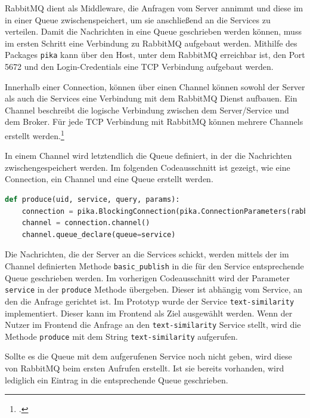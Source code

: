 RabbitMQ dient als Middleware, die Anfragen vom Server annimmt und diese im in einer Queue zwischenspeichert, um sie anschließend an die Services zu verteilen. Damit die Nachrichten in eine Queue geschrieben werden können, muss im ersten Schritt eine Verbindung zu RabbitMQ aufgebaut werden. Mithilfe des Packages \texttt{pika} kann über den Host, unter dem RabbitMQ erreichbar ist, den Port 5672 und den Login-Credentials eine TCP Verbindung aufgebaut werden.

Innerhalb einer Connection, können über einen Channel können sowohl der Server als auch die Services eine Verbindung mit dem RabbitMQ Dienst aufbauen. Ein Channel beschreibt die logische Verbindung zwischen dem Server/Service und dem Broker. Für jede TCP Verbindung mit RabbitMQ können mehrere Channels erstellt werden.\footcite{dossot2014rabbitmq}

In einem Channel wird letztendlich die Queue definiert, in der die Nachrichten zwischengespeichert werden. Im folgenden Codeausschnitt ist gezeigt, wie eine Connection, ein Channel und eine Queue erstellt werden.

\begin{lstlisting}[language=Python, caption={Verbindung zu RabbitMQ und Erstellung eines Channels und einer Queue}]
def produce(uid, service, query, params):
    connection = pika.BlockingConnection(pika.ConnectionParameters(rabbit_host, 5672, '/', credentials))
    channel = connection.channel()
    channel.queue_declare(queue=service)
\end{lstlisting}

Die Nachrichten, die der Server an die Services schickt, werden mittels der im Channel definierten Methode \texttt{basic\_{}publish} in die für den Service entsprechende Queue geschrieben werden. Im vorherigen Codeausschnitt wird der Parameter \texttt{service} in der \texttt{produce} Methode übergeben. Dieser ist abhängig vom Service, an den die Anfrage gerichtet ist. Im Prototyp wurde der Service \texttt{text-similarity} implementiert. Dieser kann im Frontend als Ziel ausgewählt werden. Wenn der Nutzer im Frontend die Anfrage an den \texttt{text-similarity} Service stellt, wird die Methode \texttt{produce} mit dem String \texttt{\glqq text-similarity\grqq{}} aufgerufen.

Sollte es die Queue mit dem aufgerufenen Service noch nicht geben, wird diese von RabbitMQ beim ersten Aufrufen erstellt. Ist sie bereits vorhanden, wird lediglich ein Eintrag in die entsprechende Queue geschrieben.

